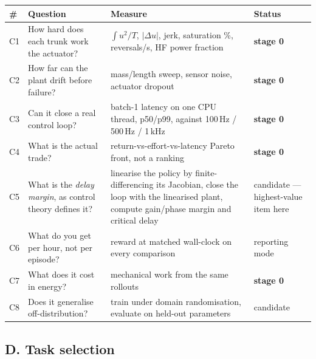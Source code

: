\documentclass[11pt]{article}
\begin{document}
\begin{center}\footnotesize
\begin{tabular}{@{}lp{}p{}p{}@{}}
\toprule
\textbf{\#} & \textbf{Question} & \textbf{Measure} & \textbf{Status} \\
\midrule
C1 & How hard does each trunk work the actuator? & $\int u^2/T$, $|\Delta u|$, jerk, saturation \%, reversals/s, HF power fraction & \textbf{stage 0} \\
C2 & How far can the plant drift before failure? & mass/length sweep, sensor noise, actuator dropout & \textbf{stage 0} \\
C3 & Can it close a real control loop? & batch-1 latency on one CPU thread, p50/p99, against 100\,Hz / 500\,Hz / 1\,kHz & \textbf{stage 0} \\
C4 & What is the actual trade? & return-vs-effort-vs-latency Pareto front, not a ranking & \textbf{stage 0} \\
C5 & What is the \emph{delay margin}, as control theory defines it? & linearise the policy by finite-differencing its Jacobian, close the loop with the linearised plant, compute gain/phase margin and critical delay & candidate --- highest-value item here \\
C6 & What do you get per hour, not per episode? & reward at matched wall-clock on every comparison & reporting mode \\
C7 & What does it cost in energy? & mechanical work from the same rollouts & \textbf{stage 0} \\
C8 & Does it generalise off-distribution? & train under domain randomisation, evaluate on held-out parameters & candidate \\
\bottomrule
\end{tabular}
\end{center}

\subsection{D. Task selection}
\end{document}
